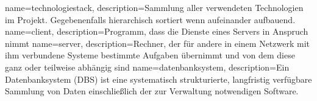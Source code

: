 {
  name=technologiestack,
  description={Sammlung aller verwendeten Technologien im Projekt. Gegebenenfalls hierarchisch sortiert wenn aufeinander aufbauend.}
}
{
  name=client,
  description={Programm, dass die Dienste eines Servers in Anspruch nimmt}
}
{
  name=server,
  description={Rechner, der für andere in einem Netzwerk mit ihm verbundene Systeme bestimmte Aufgaben übernimmt und von dem diese ganz oder teilweise abhängig sind}
}
{
  name=datenbanksystem,
  description={Ein Datenbanksystem (DBS) ist eine systematisch strukturierte, langfristig verfügbare Sammlung von Daten einschließlich der zur Verwaltung notwendigen Software.}
}

\renewcommand*{\glossaryname}{\section{\glossarName}}

\glsaddall
\printglossaries

